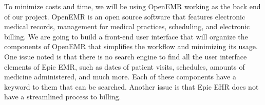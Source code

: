 To minimize costs and time, we will be using OpenEMR working as the back end of our project. OpenEMR is an open source software that features electronic medical records, management for medical practices, scheduling, and electronic billing. We are going to build a front-end user interface that will organize the components of OpenEMR that simplifies the workflow and minimizing its usage.
One issue noted is that there is no search engine to find all the user interface elements of Epic EMR, such as dates of patient visits, schedules, amounts of medicine administered, and much more. Each of these components have a keyword to them that can be searched. Another issue is that Epic EHR does not have a streamlined process to billing.